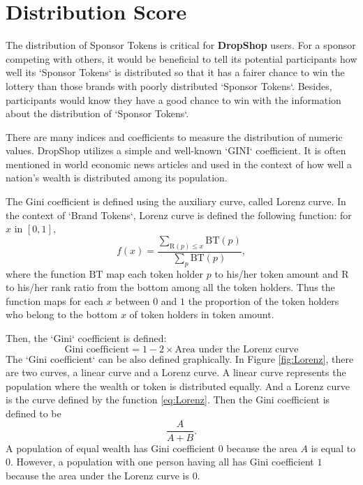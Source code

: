 \documentclass[runningheads]{llncs}
\begin{document}
\section{Distribution Score}\label{APP-DistributionFunctions}
The distribution of Sponsor Tokens is critical for \textbf{DropShop} users. For a sponsor competing with others, it would be beneficial to tell its potential participants how well its `Sponsor Tokens` is distributed so that it has a fairer chance to win the lottery than those brands with poorly distributed `Sponsor Tokens`. Besides, participants would know they have a good chance to win with the information about the distribution of `Sponsor Tokens`.  

There are many indices and coefficients to measure the distribution of numeric values. DropShop utilizes a simple and well-known `GINI` coefficient. It is often mentioned in world economic news articles and used in the context of how well a nation's wealth is distributed among its population.

The Gini coefficient is defined using the auxiliary curve, called Lorenz curve. In the context of `Brand Tokens`, Lorenz curve is defined the following function: for $x$ in $[0,1]$,
\begin{equation}\label{eq:Lorenz}
f(x) =  \frac{ \sum_{\mathrm{R} (p) \leq x} \mathrm{BT} (p) }{\sum_{p} \mathrm{BT} (p)},
\end{equation}
where the function $\mathrm{BT}$ map each token holder $p$ to his/her token amount and $\mathrm{R}$ to his/her rank ratio from the bottom among all the token holders. Thus the function maps for each $x$ between $0$ and $1$ the proportion of the token holders who belong to the bottom $x$ of token holders in token amount.

Then, the `Gini` coefficient is defined:
$$
\textrm{Gini coefficient} = 1 - 2 \times \textrm{Area under the Lorenz curve}
$$
The `Gini coefficient` can be also defined graphically. In Figure \ref{fig:Lorenz}, there are two curves, a linear curve and a Lorenz curve. A linear curve represents the population where the wealth or token is distributed  equally. And a Lorenz curve is the curve defined by the function \ref{eq:Lorenz}. Then the Gini coefficient is defined to be
$$
\frac{A}{A+B}.
$$
A population of equal wealth has Gini coefficient $0$ because the area $A$ is equal to $0$. However, a population with one person having all has Gini coefficient  $1$ because the area under the Lorenz curve is $0$.
\end{document}
